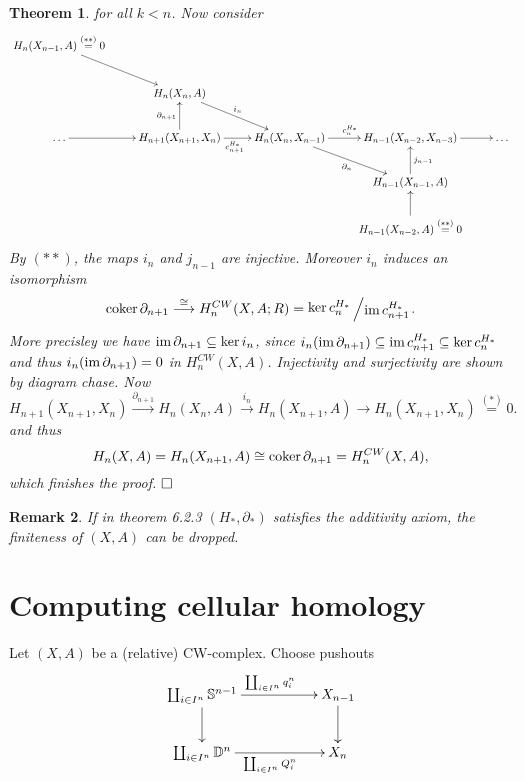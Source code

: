 \documentclass[11pt]{book}
\numberwithin{dummy}{section}
\newtheorem{theorem}{Theorem}[section]
\newtheorem{remark}[theorem]{Remark}
\theoremstyle{nonumberbreak}
\newenvironment{pr}[1][]{\ifthenelse{\equal{#1}{}}{\proof}{\proof[#1]}\rm}{\endproof}
\newcommand{\im}{\mathrm{im} \hspace{1.5pt}}
\newcommand{\cokern}{\mathrm{coker}\hspace{1.5pt}}
\newcommand{\Sph}{\mathbb{S}}
\newcommand{\la}{\longrightarrow}
\newcommand{\slant}[2]{{\raisebox{.1em}{$#1$}\left/\raisebox{-.1em}{$#2$}\right.}}
\begin{document}
\begin{spacing}{1.4}
\begin{theorem}
\begin{pr}
for all $k<n$. Now consider
$$
\begin{xy}
\xymatrix{
 H_n(X_{n-1},A)\overset{(**)}{=}0 \ar[rd] &&&& \\
&H_n(X_n,A) \ar[rd]^{i_n} &&& \\
 \ldots \ar[r] & H_{n+1}(X_{n+1},X_n) \ar[u]^{\partial_{n+1}} \ar[r]_{c_{n+1}^{H_*}} & H_n(X_n,X_{n-1}) \ar[rd]_{\partial_n} \ar[r]^{c_n^{H_*}} & H_{n-1}(X_{n-2},X_{n-3}) \ar[r] & \ldots \\
 &&&H_{n-1}(X_{n-1},A) \ar[u]_{j_{n-1}} & \\
 &&& H_{n-1}(X_{n-2},A)\overset{(**)}{=}0 \ar[u]& 
}
\end{xy}
$$
By $(**)$, the maps $i_n$ and $j_{n-1}$ are injective. Moreover $i_n$ induces an isomorphism
$$\cokern \partial_{n+1} \overset{\cong}{\la} H_n^{CW}(X,A;R) = \slant{\ker c_n^{H_*}}{\im c_{n+1}^{H_*}}.$$
More precisley we have $\im \partial_{n+1} \subseteq \ker i_n$, since $i_n(\im \partial_{n+1}) \subseteq \im c_{n+1}^{H_*} \subseteq \ker c_n^{H_*}$ and thus $i_n(\im \partial_{n+1}) =0$ in $H_n^{CW}(X,A)$. Injectivity and surjectivity are shown by diagram chase. Now
$$H_{n+1}(X_{n+1},X_n) \overset{\partial_{n+1}}{\la} H_n(X_n,A) \overset{i_n}{\la} H_n(X_{n+1},A) \la H_n(X_{n+1},X_n) \overset{(*)}{=}0.$$ 
and thus 
$$H_n(X,A) = H_n(X_{n+1},A) \cong \cokern \partial_{n+1}= H_n^{CW}(X,A),$$
which finishes the proof. $\hfill \Box$




\end{pr}

\end{theorem}

\begin{remark}
If in theorem 6.2.3 $(H_*, \partial_*)$ satisfies the additivity axiom, the finiteness of $(X,A)$ can be dropped.
\end{remark}














\section{Computing cellular homology} %

Let $(X,A)$ be a (relative) CW-complex. Choose pushouts
$$
\begin{xy}
\xymatrix{
\coprod_{i \in I^n}\Sph^{n-1} \ar[d] \ar[rr]^{\coprod_{i \in I^n} q_i^n} && X_{n-1} \ar[d] \\ \coprod_{i \in I^n} \mathbb{D}^n \ar[rr]_{\coprod_{i \in I^n} Q_i^n} && X_n
}
\end{xy}
$$


\end{spacing}
\end{document}
